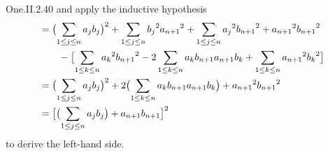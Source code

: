 \begin{ans}{One.II.2.40}
       and apply the inductive hypothesis
       \begin{align*}
         &=
         \bigl( \sum_{1\leq j\leq n}a_jb_j\bigr)^2
         +
         \sum_{1\leq j\leq n}{b_j}^2{a_{n+1}}^2
         +
         \sum_{1\leq j\leq n}{a_j}^2{b_{n+1}}^2
         +
         {a_{n+1}}^2{b_{n+1}}^2                          \\
         &\hbox{}\qquad\hbox{}-
         \bigl[\sum_{1\leq k\leq n}{a_k}^2{b_{n+1}}^2
           -2\sum_{1\leq k\leq n}a_kb_{n+1}a_{n+1}b_k
           +\sum_{1\leq k\leq n}{a_{n+1}}^2{b_k}^2\bigr]        \\
         &=
         \bigl( \sum_{1\leq j\leq n}a_jb_j\bigr)^2
         +2\bigl(\sum_{1\leq k\leq n}a_kb_{n+1}a_{n+1}b_k\bigr)
         +{a_{n+1}}^2{b_{n+1}}^2                                 \\
         &=
         \bigl[\bigl(\sum_{1\leq j\leq n}a_jb_j\bigr)+a_{n+1}b_{n+1}\bigr]^2
       \end{align*}
       to derive the left-hand side.
   
\end{ans}
